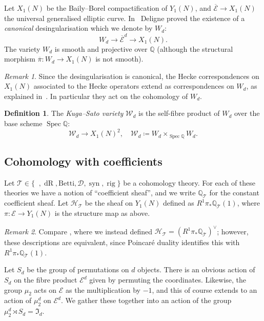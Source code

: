 \documentclass[11pt, a4paper, reqno]{amsart}
\theoremstyle{definition}
\newtheorem{definition}{Definition}[subsection]
\theoremstyle{plain}
\theoremstyle{remark}
\newtheorem*{remark}{Remark}
\DeclareMathOperator{\Spec}{Spec}
\DeclareMathOperator{\et}{\acute{e}t}
\DeclareMathOperator{\syn}{syn}
\DeclareMathOperator{\rig}{rig}
\DeclareMathOperator{\dR}{dR}
\newcommand{\numberset}{\mathbb}
\newcommand{\Q}{\numberset{Q}}
\newcommand{\HS}{\mathscr{H}}
\newcommand{\ideal}{\mathfrak}
\newcommand{\Ell}{\mathcal{E}}
\newcommand{\KS}{\mathscr{W}}
\newcommand{\theory}{\mathcal{T}}
\newcommand{\del}{\mathcal{D}}
\begin{document}
  Let $X_1(N)$ be the Baily--Borel compactification of $Y_1(N)$, and $\overline{\Ell} \to X_1(N)$ the universal generalised elliptic curve. In~\cite{deligne69} Deligne proved the existence of a \emph{canonical} desingularisation which we denote by $W_d$:
  \[
   W_d \to \overline{\Ell}^d \to X_1(N).
  \]
  The variety $W_d$ is smooth and projective over $\Q$ (although the structural morphism $\overline{\pi} \colon W_d \to X_1(N)$ is not smooth). %

  \begin{remark}
   \label{remark:hecke-ops}
   Since the desingularisation is canonical, the Hecke correspondences on $X_1(N)$ associated to the Hecke operators extend as correspondences on $W_d$, as explained in~\cite[§4]{scholl90}. In particular they act on the cohomology of $W_d$.
  \end{remark}

  \begin{definition}
   The \emph{Kuga--Sato variety} $\KS_d$ is the self-fibre product of $W_d$ over the base scheme $\Spec \Q$:
   \[
    \KS_d \to X_1(N)^2, \quad \KS_d \coloneqq W_d \times_{\Spec \Q} W_d.
   \]
  \end{definition}

  \subsection{Cohomology with coefficients}

  Let $\theory\in\{\et,\dR,\mathrm{Betti},\del,\syn,\rig\}$ be a cohomology theory. For each of these theories we have a notion of ``coefficient sheaf'', and we write $\Q_{\theory}$ for the constant coefficient sheaf. Let $\HS_{\theory}$ be the sheaf on $Y_1(N)$ defined as $R^1\pi_* \Q_{\theory}(1)$, where $\pi: \Ell \to Y_1(N)$ is the structure map as above.
  
  \begin{remark}
   Compare \cite[\S 3]{KLZ20}, where we instead defined $\HS_{\theory} = (R^1\pi_* \Q_{\theory})^\vee$; however, these descriptions are equivalent, since Poincar\'e duality identifies this with $R^1\pi_* \Q_{\theory}(1)$.
  \end{remark}

  Let $S_d$ be the group of permutations on $d$ objects. There is an obvious action of $S_d$ on the fibre product $\Ell^d$ given by permuting the coordinates. Likewise, the group $\mu_2$ acts on $\Ell$ as the multiplication by $-1$, and this of course extends to an action of $\mu_2^d$ on $\Ell^d$. We gather these together into an action of the group $\mu_2^d \rtimes S_d = \ideal{I}_d$.
\end{document}
